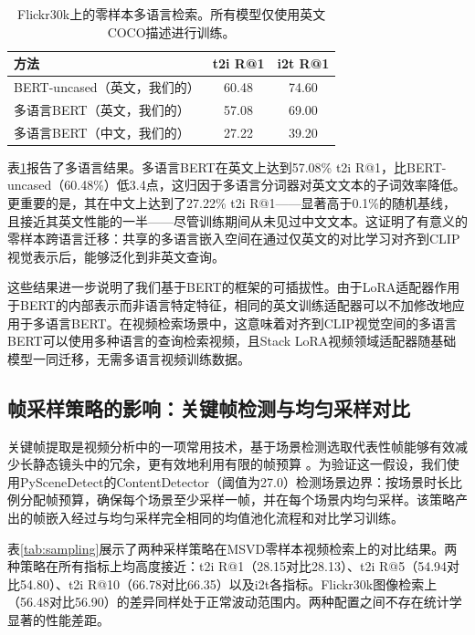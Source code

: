 \documentclass[10pt,a4paper]{ctexart}
\begin{document}
\begin{table}[htbp]
\centering
\caption{Flickr30k上的零样本多语言检索。所有模型仅使用英文COCO描述进行训练。}
\label{tab:multilingual}
\begin{tabular}{lcc}
\toprule
方法 & t2i R@1 & i2t R@1 \\
\midrule
BERT-uncased（英文，我们的） & 60.48 & 74.60 \\
多语言BERT（英文，我们的） & 57.08 & 69.00 \\
多语言BERT（中文，我们的） & 27.22 & 39.20 \\
\bottomrule
\end{tabular}
\end{table}

表\ref{tab:multilingual}报告了多语言结果。多语言BERT在英文上达到57.08\% t2i R@1，比BERT-uncased（60.48\%）低3.4点，这归因于多语言分词器对英文文本的子词效率降低。更重要的是，其在中文上达到了27.22\% t2i R@1——显著高于0.1\%的随机基线，且接近其英文性能的一半——尽管训练期间从未见过中文文本。这证明了有意义的零样本跨语言迁移：共享的多语言嵌入空间在通过仅英文的对比学习对齐到CLIP视觉表示后，能够泛化到非英文查询。

这些结果进一步说明了我们基于BERT的框架的可插拔性。由于LoRA适配器作用于BERT的内部表示而非语言特定特征，相同的英文训练适配器可以不加修改地应用于多语言BERT。在视频检索场景中，这意味着对齐到CLIP视觉空间的多语言BERT可以使用多种语言的查询检索视频，且Stack LoRA视频领域适配器随基础模型一同迁移，无需多语言视频训练数据。

\subsection{帧采样策略的影响：关键帧检测与均匀采样对比}

关键帧提取是视频分析中的一项常用技术，基于场景检测选取代表性帧能够有效减少长静态镜头中的冗余，更有效地利用有限的帧预算 \citep{asha2018keyframe}。为验证这一假设，我们使用PySceneDetect的ContentDetector（阈值为27.0）检测场景边界：按场景时长比例分配帧预算，确保每个场景至少采样一帧，并在每个场景内均匀采样。该策略产出的帧嵌入经过与均匀采样完全相同的均值池化流程和对比学习训练。

表\ref{tab:sampling}展示了两种采样策略在MSVD零样本视频检索上的对比结果。两种策略在所有指标上均高度接近：t2i R@1（28.15对比28.13）、t2i R@5（54.94对比54.80）、t2i R@10（66.78对比66.35）以及i2t各指标。Flickr30k图像检索上（56.48对比56.90）的差异同样处于正常波动范围内。两种配置之间不存在统计学显著的性能差距。
\end{document}
